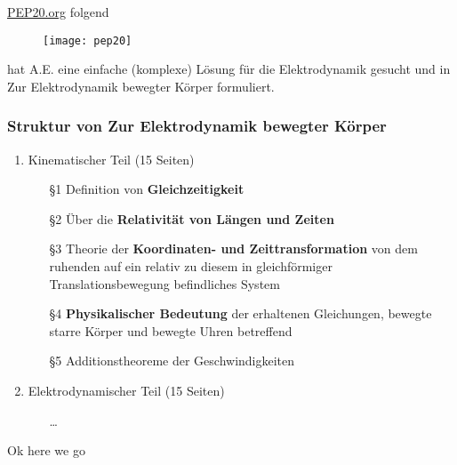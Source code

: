 \documentclass[]{beamer}%
\begin{document}
\begin{frame}
	\href{https://pep20.org/}{PEP20.org} folgend 
    \begin{figure}[h]
            \centering
            \texttt{[image: pep20]}
    \end{figure}
    
    hat A.E. eine einfache (komplexe) 
    Lösung für die Elektrodynamik gesucht und in
    \glqq Zur Elektrodynamik bewegter Körper\grqq{} formuliert.
\end{frame}

\begin{frame}
    \frametitle{Struktur von \glqq{} Zur Elektrodynamik bewegter Körper \grqq{}}
    \begin{enumerate}[I]
        \item Kinematischer Teil (15 Seiten)
        \begin{itemize}
			\item[§1]   Definition von \textbf{Gleichzeitigkeit}
			\item[§2]   Über die \textbf{Relativität von Längen und Zeiten}
			\item[§3]   Theorie der \textbf{Koordinaten- und Zeittransformation} von dem ruhenden
                        auf ein relativ zu diesem in gleichförmiger Translationsbewegung 
                        befindliches System
			\item[§4]   \textbf{Physikalischer Bedeutung} der erhaltenen Gleichungen, 
                        bewegte starre Körper und bewegte Uhren betreffend
			\item[§5]   Additionstheoreme der Geschwindigkeiten
		\end{itemize}
        \vspace{10pt}
		\item Elektrodynamischer Teil (15 Seiten)
        \begin{itemize}
            \item[]\dots
        \end{itemize}
	\end{enumerate}
\end{frame}

\begin{frame}
    Ok here we go
\end{frame}



\end{document}
